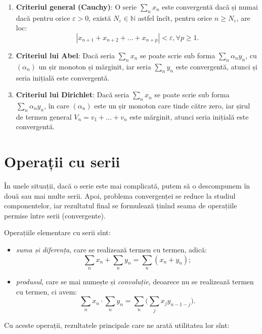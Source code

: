 \documentclass[11pt,a4paper]{article}
\newcommand\NN{\mathbb{N}}
\theoremstyle{dotless}
\theoremstyle{dotlessdr}
\begin{document}
\begin{enumerate}[(1)]
  \item \textbf{Criteriul general (Cauchy)}: O serie $\sum_n x_n$ este convergentă
    dacă și numai dacă pentru orice $\varepsilon > 0$, există $N_\varepsilon \in \NN$
    astfel încît, pentru orice $n \geq N_\varepsilon$, are loc:
    \[
      |x_{n+1} + x_{n+2} + \dots + x_{n + p} | < \varepsilon, \forall p \geq 1.
    \]
    
  \item \textbf{Criteriul lui Abel}: Dacă seria $\sum_n x_n$ se poate scrie sub forma
    $\sum_n \alpha_n y_n$, cu $(\alpha_n)$ un șir monoton și mărginit, iar seria
    $\sum_n y_n$ este convergentă, atunci și seria inițială este convergentă.

  \item \textbf{Criteriul lui Dirichlet}: Dacă seria $\sum_n x_n$ se poate scrie
    sub forma $\sum_n \alpha_n y_n$, în care $(\alpha_n)$ este un șir monoton care
    tinde către zero, iar șirul de termen general $V_n = v_1 + \dots + v_n$ este
    mărginit, atunci seria inițială este convergentă.
\end{enumerate}


\section{Operații cu serii}

În unele situații, dacă o serie este mai complicată, putem să o descompunem
în două sau mai multe serii. Apoi, problema convergenței se reduce la studiul
componentelor, iar rezultatul final se formulează ținînd seama de operațiile
permise între serii (convergente).

Operațiile elementare cu serii sînt:
\begin{itemize}
  \item \emph{suma și diferența}, care se realizează termen cu termen, adică:
    \[
      \sum_n x_n + \sum_n y_n = \sum_n (x_n + y_n);
    \]
  \item \emph{produsul}, care se mai numește și \emph{convoluție}, deoarece nu
    se realizează termen cu termen, ci avem:
    \[
      \sum_n x_n \cdot \sum_n y_n = \sum_n \Big( \sum_j x_j y_{n - 1 - j} \Big).
    \]
\end{itemize}

Cu aceste operații, rezultatele principale care ne arată utilitatea lor sînt:
\end{document}
